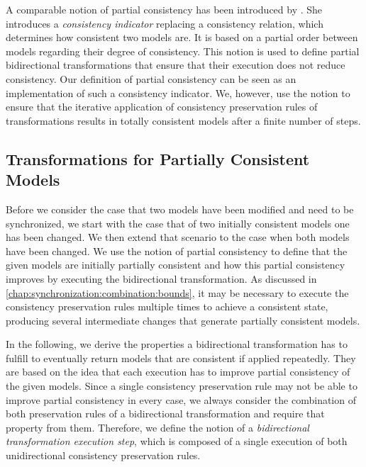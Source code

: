 A comparable notion of partial consistency has been introduced by \textcite{stevens2014Partial-FASE, stevens2020BidirectionalTransformationLarge-SoSym}.
She introduces a \emph{consistency indicator} replacing a consistency relation, which determines how consistent two models are.
It is based on a partial order between models regarding their degree of consistency.
This notion is used to define partial bidirectional transformations that ensure that their execution does not reduce consistency.
Our definition of partial consistency can be seen as an implementation of such a consistency indicator.
We, however, use the notion to ensure that the iterative application of consistency preservation rules of transformations results in totally consistent models after a finite number of steps.


\subsection{Transformations for Partially Consistent Models}
\label{chap:synchronization:bidirectional:transformations}

Before we consider the case that two models have been modified and need to be synchronized, we start with the case that of two initially consistent models one has been changed.
We then extend that scenario to the case when both models have been changed.
We use the notion of partial consistency to define that the given models are initially partially consistent and how this partial consistency improves by executing the bidirectional transformation.
As discussed in \autoref{chap:synchronization:combination:bounds}, it may be necessary to execute the consistency preservation rules multiple times to achieve a consistent state, producing several intermediate changes that generate partially consistent models.

In the following, we derive the properties a bidirectional transformation has to fulfill to eventually return models that are consistent if applied repeatedly.
They are based on the idea that each execution has to improve partial consistency of the given models.
Since a single consistency preservation rule may not be able to improve partial consistency in every case, we always consider the combination of both preservation rules of a bidirectional transformation and require that property from them.
Therefore, we define the notion of a \emph{bidirectional transformation execution step}, which is composed of a single execution of both unidirectional consistency preservation rules.

